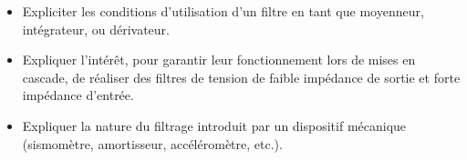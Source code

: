 \documentclass[../../main/main.tex]{subfiles}
\begin{document}
\begin{tcn}[sidebyside,
		fontupper=\footnotesize, fontlower=\footnotesize
	]
\begin{itemize}[label=\rcheck]
		      linéaire à une excitation sinusoïdale, à une somme finie
		      d'excitations sinusoïdales, à un signal périodique.
		\item Expliciter les conditions d'utilisation d'un filtre en tant que
		      moyenneur, intégrateur, ou dérivateur.
		\item Expliquer l'intérêt, pour garantir leur fonctionnement lors de mises
		      en cascade, de réaliser des filtres de tension de faible impédance
		      de sortie et forte impédance d'entrée.
		\item Expliquer la nature du filtrage introduit par un dispositif
		      mécanique (sismomètre, amortisseur, accéléromètre, etc.).
	\end{itemize}
\end{tcn}

\vspace*{\fill}
\newpage
\vspace*{\fill}
\end{document}

